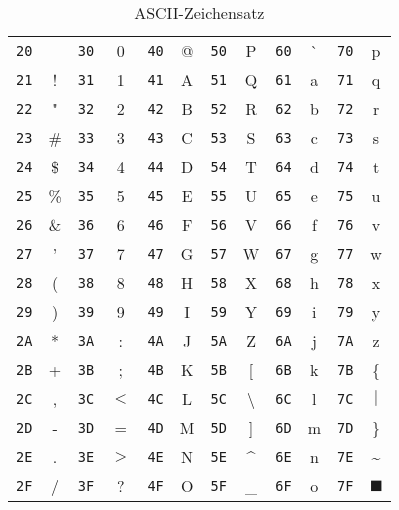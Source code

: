 \documentclass[10pt]{book}
\begin{document}
\begin{table}
\centering
\newcommand{\bs}{\textbackslash}
\begin{tabular}{ | rc | rc | rc | rc | rc | rc |}
\hline
\texttt{20} & ~    & \texttt{30} & 0    & \texttt{40} & @ &
\texttt{50} & P    & \texttt{60} & \`{} & \texttt{70} & p \\
\texttt{21} & !    & \texttt{31} & 1    & \texttt{41} & A &
\texttt{51} & Q    & \texttt{61} & a    & \texttt{71} & q \\
\texttt{22} & "    & \texttt{32} & 2    & \texttt{42} & B &
\texttt{52} & R    & \texttt{62} & b    & \texttt{72} & r \\
\texttt{23} & \#   & \texttt{33} & 3    & \texttt{43} & C &
\texttt{53} & S    & \texttt{63} & c    & \texttt{73} & s \\
\texttt{24} & \$   & \texttt{34} & 4    & \texttt{44} & D &
\texttt{54} & T    & \texttt{64} & d    & \texttt{74} & t \\
\texttt{25} & \%   & \texttt{35} & 5    & \texttt{45} & E &
\texttt{55} & U    & \texttt{65} & e    & \texttt{75} & u \\
\texttt{26} & \&   & \texttt{36} & 6    & \texttt{46} & F &
\texttt{56} & V    & \texttt{66} & f    & \texttt{76} & v \\
\texttt{27} & '    & \texttt{37} & 7    & \texttt{47} & G &
\texttt{57} & W    & \texttt{67} & g    & \texttt{77} & w \\
\texttt{28} & (    & \texttt{38} & 8    & \texttt{48} & H &
\texttt{58} & X    & \texttt{68} & h    & \texttt{78} & x \\
\texttt{29} & )    & \texttt{39} & 9    & \texttt{49} & I &
\texttt{59} & Y    & \texttt{69} & i    & \texttt{79} & y \\
\texttt{2A} & *    & \texttt{3A} & :    & \texttt{4A} & J &
\texttt{5A} & Z    & \texttt{6A} & j    & \texttt{7A} & z \\
\texttt{2B} & +    & \texttt{3B} & ;    & \texttt{4B} & K &
\texttt{5B} & [    & \texttt{6B} & k    & \texttt{7B} & \{ \\
\texttt{2C} & ,    & \texttt{3C} & $<$  & \texttt{4C} & L &
\texttt{5C} & \bs  & \texttt{6C} & l    & \texttt{7C} & $|$ \\
\texttt{2D} & -    & \texttt{3D} & =    & \texttt{4D} & M &
\texttt{5D} & ]    & \texttt{6D} & m    & \texttt{7D} & \} \\
\texttt{2E} & .    & \texttt{3E} & $>$  & \texttt{4E} & N &
\texttt{5E} & \^{} & \texttt{6E} & n    & \texttt{7E} & \textasciitilde \\
\texttt{2F} & /    & \texttt{3F} & ?    & \texttt{4F} & O &
\texttt{5F} & \_{} & \texttt{6F} & o    & \texttt{7F} & $\blacksquare$ \\
\hline

\end{tabular}
\caption{ASCII-Zeichensatz}
\label{tab:ascii}
\end{table}
\end{document}
